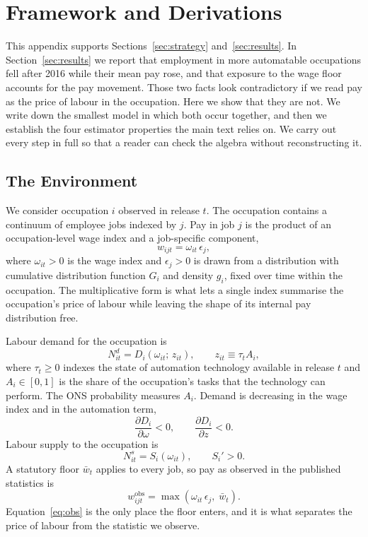 \documentclass[12pt,leqno]{article}
\begin{document}
\section{Framework and Derivations}\label{app:theory}

This appendix supports Sections~\ref{sec:strategy} and~\ref{sec:results}. In Section~\ref{sec:results} we report that employment in more automatable occupations fell after 2016 while their mean pay rose, and that exposure to the wage floor accounts for the pay movement. Those two facts look contradictory if we read pay as the price of labour in the occupation. Here we show that they are not. We write down the smallest model in which both occur together, and then we establish the four estimator properties the main text relies on. We carry out every step in full so that a reader can check the algebra without reconstructing it.

\subsection{The Environment}

We consider occupation $i$ observed in release $t$. The occupation contains a continuum of employee jobs indexed by $j$. Pay in job $j$ is the product of an occupation-level wage index and a job-specific component,
\begin{equation}
w_{ijt} = \omega_{it}\,\epsilon_j ,
\end{equation}
where $\omega_{it} > 0$ is the wage index and $\epsilon_j > 0$ is drawn from a distribution with cumulative distribution function $G_i$ and density $g_i$, fixed over time within the occupation. The multiplicative form is what lets a single index summarise the occupation's price of labour while leaving the shape of its internal pay distribution free.

Labour demand for the occupation is
\begin{equation}
N^{d}_{it} = D_i\!\left(\omega_{it};\, z_{it}\right), \qquad z_{it} \equiv \tau_t A_i ,
\end{equation}
where $\tau_t \geq 0$ indexes the state of automation technology available in release $t$ and $A_i \in [0,1]$ is the share of the occupation's tasks that the technology can perform. The ONS probability measures $A_i$. Demand is decreasing in the wage index and in the automation term,
\begin{equation}
\frac{\partial D_i}{\partial \omega} < 0, \qquad \frac{\partial D_i}{\partial z} < 0 .
\end{equation}
Labour supply to the occupation is
\begin{equation}
N^{s}_{it} = S_i\!\left(\omega_{it}\right), \qquad S_i' > 0 .
\end{equation}
A statutory floor $\bar{w}_t$ applies to every job, so pay as observed in the published statistics is
\begin{equation}\label{eq:obs}
w^{\mathrm{obs}}_{ijt} = \max\!\left(\omega_{it}\,\epsilon_j,\; \bar{w}_t\right).
\end{equation}
Equation~\eqref{eq:obs} is the only place the floor enters, and it is what separates the price of labour from the statistic we observe.
\end{document}
